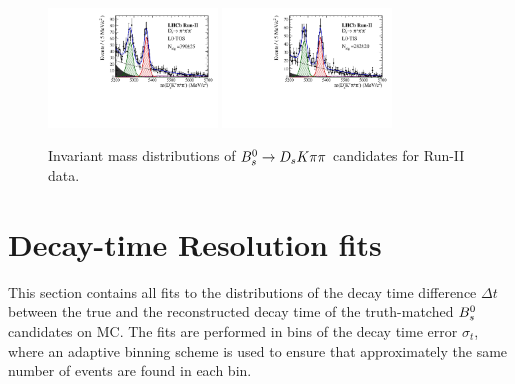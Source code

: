 \begin{figure}[h]
\includegraphics[height=!,width=0.4\textwidth]{figs/MassFit/signal_Run2_pipipi_t0.pdf}
\includegraphics[height=!,width=0.4\textwidth]{figs/MassFit/signal_Run2_pipipi_t1.pdf}

\caption{Invariant mass distributions of ${{B}^0_{s}}\rightarrow{\ensuremath{{D}_{s}}} K{\pi}{\pi}$ candidates for Run-II data.}
\label{fig:massfits_signal_Run2}
\end{figure}


\clearpage
\section{Decay-time Resolution fits}
\label{sec:DecResFits}

\setcounter{figure}{0}
\setcounter{table}{0}

\renewcommand{\thefigure}{E.\arabic{figure}}
\renewcommand{\thetable}{E.\arabic{table}}

This section contains all fits to the distributions of the decay time difference $\Delta t$ between the true and the reconstructed decay time of the truth-matched ${{B}^0_{s}}$ candidates on MC.
The fits are performed in bins of the decay time error $\sigma_{t}$, where an adaptive binning scheme is used to ensure that approximately the same number of events are found in each bin. 

